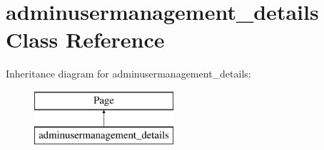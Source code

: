 \hypertarget{classadminusermanagement__details}{\section{adminusermanagement\-\_\-details Class Reference}
\label{classadminusermanagement__details}
}
Inheritance diagram for adminusermanagement\-\_\-details\-:\begin{figure}[H]
\begin{center}
\leavevmode
\includegraphics[height=2.000000cm]{classadminusermanagement__details}
\end{center}
\end{figure}
